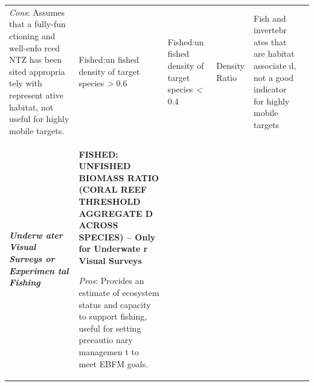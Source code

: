 \documentclass[]{book}
\begin{document}
\begin{longtable}[]{@{}llllll@{}}
\begin{minipage}[t]{0.16\columnwidth}
\emph{Cons}: Assumes that a fully-fun ctioning and well-enfo rced NTZ
has been sited appropria tely with represent ative habitat, not useful
for highly mobile targets.\strut
\end{minipage} & \begin{minipage}[t]{0.16\columnwidth}\raggedright\strut
Fished:un fished density of target species \emph{\textgreater{}}
0.6\strut
\end{minipage} & \begin{minipage}[t]{0.16\columnwidth}\raggedright\strut
Fished:un fished density of target species \emph{\textless{}} 0.4\strut
\end{minipage} & \begin{minipage}[t]{0.16\columnwidth}\raggedright\strut
Density Ratio\strut
\end{minipage} & \begin{minipage}[t]{0.16\columnwidth}\raggedright\strut
Fish and invertebr ates that are habitat associate d, not a good
indicator for highly mobile targets\strut
\end{minipage}\tabularnewline
\begin{minipage}[t]{0.16\columnwidth}\raggedright\strut
\emph{\textbf{Underw ater Visual Surveys or Experimen tal Fishing}
}\strut
\end{minipage} & \begin{minipage}[t]{0.16\columnwidth}\raggedright\strut
\textbf{FISHED: UNFISHED BIOMASS RATIO (CORAL REEF THRESHOLD AGGREGATE D
ACROSS SPECIES) -- Only for Underwate r Visual Surveys}

\emph{Pros}: Provides an estimate of ecosystem status and capacity to
support fishing, useful for setting precautio nary managemen t to meet
EBFM goals.


\end{minipage}
\end{longtable}
\end{document}
